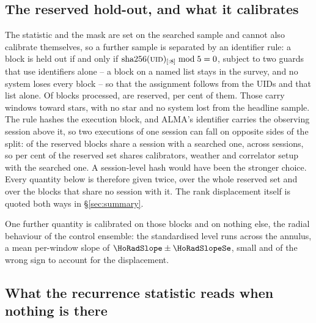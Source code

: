 \subsection{The reserved hold-out, and what it calibrates}
\label{sec:heldout}

The statistic and the mask are set on the searched sample and cannot also
calibrate themselves, so a further sample is separated by an identifier rule:
a block is held out if and only if
$\mathrm{sha256}(\textsc{uid})_{[:8]} \bmod 5 = 0$, subject to two guards that
use identifiers alone -- a block on a named list stays in the
survey, and no system loses every block -- so that the assignment follows
from the UIDs and that list alone. Of
\NEbProcessedAll{} blocks processed, \NEbHeldOut{} are reserved, \HoPctHeld{}
per cent of them. Those carry \HoWin{} windows toward \HoStars{} stars, with
no star and no system lost from the headline sample. The rule hashes the
execution block, and ALMA's
identifier carries the observing session above it, so two executions of one session can fall on opposite sides of the split:
\BkSessHoBlocks{} of the
\NEbHeldOut{} reserved blocks share a session with a searched one, across
\BkSessShared{} sessions, so \HsSharePct{} per cent of the reserved set shares
calibrators, weather and correlator setup with the searched one. A
session-level hash would have been the stronger choice.
Every quantity below is therefore given twice, over the whole reserved set and
over the \HsIndBlocks{} blocks that share no session with it. The rank
displacement itself is quoted both ways in \S\ref{sec:summary}.

One further quantity is calibrated on those blocks and on nothing else, the
radial behaviour of the control ensemble: the standardised level
runs \HoRadBins{} across the annulus, a mean per-window slope of
$\HoRadSlope\pm\HoRadSlopeSe$, small and of the wrong sign to account for the
displacement.

\subsection{What the recurrence statistic reads when nothing is there}
\label{sec:nullscatter}

